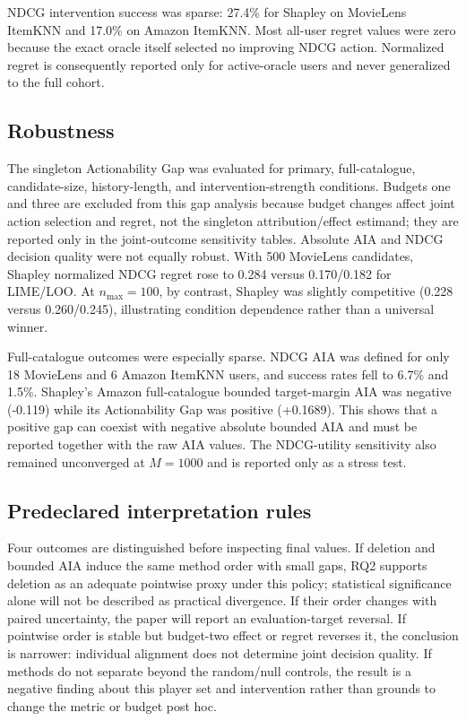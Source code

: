 \documentclass[pdflatex,sn-basic]{sn-jnl}
\begin{document}
NDCG intervention success was sparse: 27.4\% for Shapley on MovieLens ItemKNN and 17.0\% on Amazon ItemKNN. Most all-user regret values were zero because the exact oracle itself selected no improving NDCG action. Normalized regret is consequently reported only for active-oracle users and never generalized to the full cohort.

\subsection{Robustness}
The singleton Actionability Gap was evaluated for primary, full-catalogue, candidate-size, history-length, and intervention-strength conditions. Budgets one and three are excluded from this gap analysis because budget changes affect joint action selection and regret, not the singleton attribution/effect estimand; they are reported only in the joint-outcome sensitivity tables. Absolute AIA and NDCG decision quality were not equally robust. With 500 MovieLens candidates, Shapley normalized NDCG regret rose to 0.284 versus 0.170/0.182 for LIME/LOO. At $n_{\max}=100$, by contrast, Shapley was slightly competitive (0.228 versus 0.260/0.245), illustrating condition dependence rather than a universal winner.

Full-catalogue outcomes were especially sparse. NDCG AIA was defined for only 18 MovieLens and 6 Amazon ItemKNN users, and success rates fell to 6.7\% and 1.5\%. Shapley's Amazon full-catalogue bounded target-margin AIA was negative (-0.119) while its Actionability Gap was positive (+0.1689). This shows that a positive gap can coexist with negative absolute bounded AIA and must be reported together with the raw AIA values. The NDCG-utility sensitivity also remained unconverged at $M=1000$ and is reported only as a stress test.

\subsection{Predeclared interpretation rules}
Four outcomes are distinguished before inspecting final values. If deletion and bounded AIA induce the same method order with small gaps, RQ2 supports deletion as an adequate pointwise proxy under this policy; statistical significance alone will not be described as practical divergence. If their order changes with paired uncertainty, the paper will report an evaluation-target reversal. If pointwise order is stable but budget-two effect or regret reverses it, the conclusion is narrower: individual alignment does not determine joint decision quality. If methods do not separate beyond the random/null controls, the result is a negative finding about this player set and intervention rather than grounds to change the metric or budget post hoc.
\end{document}
